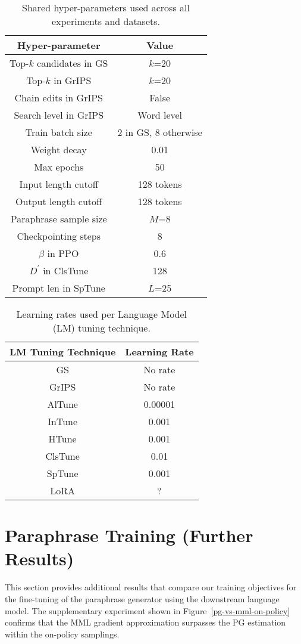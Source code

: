 \documentclass[11pt]{article}
\begin{document}
\begin{table}[t]
\centering
\caption{Shared hyper-parameters used across all experiments and datasets.}
\begin{tabular}{ c | c }
\hline
Hyper-parameter & Value\\
\hline
Top-$k$ candidates in GS & $k$=20 \\
Top-$k$ in GrIPS & $k$=20 \\
Chain edits in GrIPS & False \\
Search level in GrIPS & Word level \\
Train batch size & 2 in GS, 8 otherwise \\
Weight decay & 0.01 \\
Max epochs & 50 \\
Input length cutoff & 128 tokens \\
Output length cutoff & 128 tokens \\
Paraphrase sample size & $M$=8 \\
Checkpointing steps & 8 \\
$\beta$ in PPO & 0.6 \\
$D^{'}$ in ClsTune & 128 \\
Prompt len in SpTune & $L$=25
\end{tabular}
\label{hyper-parameters}
\end{table}

\begin{table}[t]
\centering
\caption{Learning rates used per Language Model (LM) tuning technique.}
\begin{tabular}{ c | c }
\hline
LM Tuning Technique & Learning Rate\\
\hline
GS & No rate \\
GrIPS & No rate \\
AlTune & 0.00001 \\
InTune &  0.001 \\
HTune & 0.001 \\
ClsTune & 0.01 \\
SpTune & 0.001 \\
LoRA & ?
\end{tabular}
\label{learning-rates}
\end{table}

\section{Paraphrase Training (Further Results)}
\label{training-paraphrase-extra:appendix}

This section provides additional results that compare our training objectives for the fine-tuning of the paraphrase generator using the downstream language model. The supplementary experiment shown in Figure~\ref{pg-vs-mml-on-policy} confirms that the MML gradient approximation surpasses the PG estimation within the on-policy samplings.
\end{document}
